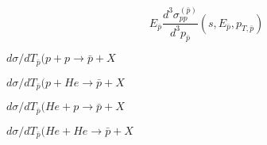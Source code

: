 \documentclass{article}
\begin{document}
\[ E_{\bar{p}} \frac{ d^3 \sigma_{pp}^{(\bar{p})} }{d^3 p_{\bar{p}} } (s, E_{\bar{p}}, p_{T,\bar{p}}) \]
\pagebreak

$ d\sigma/dT_{\bar{p}} (p+p\rightarrow\bar{p}+X $
\pagebreak

$ d\sigma/dT_{\bar{p}} (p+He\rightarrow\bar{p}+X $
\pagebreak

$ d\sigma/dT_{\bar{p}} (He+p\rightarrow\bar{p}+X $
\pagebreak

$ d\sigma/dT_{\bar{p}} (He+He\rightarrow\bar{p}+X $
\pagebreak
\end{document}

